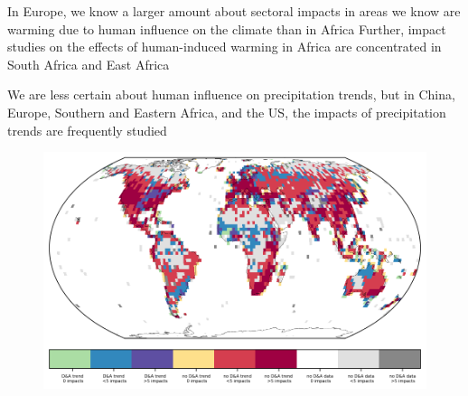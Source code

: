 \documentclass[9pt]{beamer}
\begin{document}
\begin{frame}{In Europe, we know a larger amount about sectoral impacts in areas we know are warming due to human influence on the climate than in Africa}
Further, impact studies on the effects of human-induced warming in Africa are concentrated in South Africa and East Africa

\end{frame}


\begin{frame}{We are less certain about human influence on precipitation trends, but in China, Europe, Southern and Eastern Africa, and the US, the impacts of precipitation trends are frequently studied }

\begin{figure}
	\includegraphics[width=\linewidth]{../plots/maps/gridcells_da_studies_precip_2_5_global.png}
\end{figure}

\end{frame}
\end{document}
